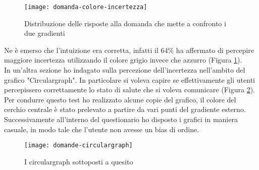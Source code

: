 
\begin{figure}[!ht] 
    \centering 
    \texttt{[image: domanda-colore-incertezza]}
    \caption{Distribuzione delle risposte alla domanda che mette a confronto i due gradienti}
    \label{fig:domanda-colore-incertezza}
\end{figure}

Ne è emerso che l'intuizione era corretta, infatti il 64\% ha affermato di percepire maggiore incertezza utilizzando il colore grigio invece che azzurro (Figura \ref{fig:domanda-colore-incertezza}). \\

In un'altra sezione ho indagato sulla percezione dell'incertezza nell'ambito del grafico "Circulargraph". In particolare si voleva capire se effettivamente gli utenti percepissero correttamente lo stato di salute che si voleva comunicare (Figura \ref{fig:domande-circulargraph}). Per condurre questo test ho realizzato alcune copie del grafico, il colore del cerchio centrale è stato prelevato a partire da vari punti del gradiente esterno. Successivamente all'interno del questionario ho disposto i grafici in maniera casuale, in modo tale che l'utente non avesse un bias di ordine. \\

\begin{figure}[!ht] 
    \centering 
    \texttt{[image: domande-circulargraph]}
    \caption{I circulargraph sottoposti a quesito}
    \label{fig:domande-circulargraph}
\end{figure}


